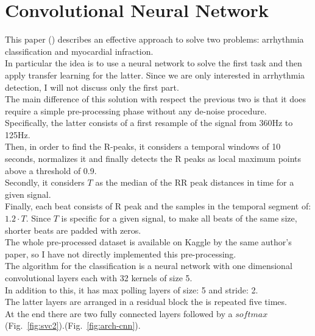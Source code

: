 \documentclass[LaM,binding=0.6cm]{sapthesis}
\begin{document}
\section{Convolutional Neural Network  \cite{cnnfazeli}}
This paper (\cite{cnnfazeli}) describes an effective approach to solve two problems: arrhythmia classification and myocardial infraction.\\In particular the idea is to use a neural network to solve the first task and then apply transfer learning for the latter. Since we are only interested in arrhythmia detection, I will not discuss only the first part.\\The main difference of this solution with respect the previous two is that it does require a simple pre-processing phase without any de-noise procedure.\\Specifically, the latter consists of a first resample of the signal from 360Hz to 125Hz.\\Then, in order to find the R-peaks, it considers a temporal windows of 10 seconds, normalizes it and finally detects the R peaks as local maximum points above a threshold of 0.9.\\Secondly, it considers $T$ as the median of the RR peak distances in time for a given signal.\\Finally, each beat consists of R peak and the samples in the temporal segment of: $1.2 \cdot T$. Since $T$ is specific for a given signal, to make all beats of the same size, shorter beats are padded with zeros.\\The whole pre-processed dataset is available on Kaggle by the same author's paper, so I have not directly implemented this pre-processing.\\The algorithm for the classification is a neural network with one dimensional convolutional layers each with 32 kernels of size 5.\\In addition to this, it has max polling layers of size: 5 and stride: 2.\\The latter layers are arranged in a residual block the is repeated five times.\\At the end there are two fully connected layers followed by a $softmax$ (Fig.~\ref{fig:svc2}).(Fig.~\ref{fig:arch-cnn}).
\end{document}
